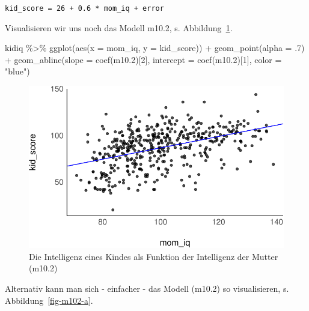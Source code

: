 \documentclass[
  a4paper,
  DIV=11]{scrreprt}
\newenvironment{Shaded}{\begin{snugshade}}{\end{snugshade}}
\newcommand{\AttributeTok}[1]{\textcolor[rgb]{0.40,0.45,0.13}{#1}}
\newcommand{\DecValTok}[1]{\textcolor[rgb]{0.68,0.00,0.00}{#1}}
\newcommand{\FloatTok}[1]{\textcolor[rgb]{0.68,0.00,0.00}{#1}}
\newcommand{\FunctionTok}[1]{\textcolor[rgb]{0.28,0.35,0.67}{#1}}
\newcommand{\NormalTok}[1]{\textcolor[rgb]{0.00,0.23,0.31}{#1}}
\newcommand{\SpecialCharTok}[1]{\textcolor[rgb]{0.37,0.37,0.37}{#1}}
\newcommand{\StringTok}[1]{\textcolor[rgb]{0.13,0.47,0.30}{#1}}
\theoremstyle{definition}
\theoremstyle{remark}
\begin{document}
\texttt{kid\_score\ =\ 26\ +\ 0.6\ *\ mom\_iq\ +\ error}

Visualisieren wir uns noch das Modell m10.2, s.
Abbildung~\ref{fig-kidiqmomiq}.

\begin{Shaded}
\begin{Highlighting}[]
\NormalTok{kidiq }\SpecialCharTok{\%\textgreater{}\%} 
  \FunctionTok{ggplot}\NormalTok{(}\FunctionTok{aes}\NormalTok{(}\AttributeTok{x =}\NormalTok{ mom\_iq, }\AttributeTok{y =}\NormalTok{ kid\_score)) }\SpecialCharTok{+}
  \FunctionTok{geom\_point}\NormalTok{(}\AttributeTok{alpha =}\NormalTok{ .}\DecValTok{7}\NormalTok{) }\SpecialCharTok{+}
  \FunctionTok{geom\_abline}\NormalTok{(}\AttributeTok{slope =} \FunctionTok{coef}\NormalTok{(m10}\FloatTok{.2}\NormalTok{)[}\DecValTok{2}\NormalTok{],}
              \AttributeTok{intercept =} \FunctionTok{coef}\NormalTok{(m10}\FloatTok{.2}\NormalTok{)[}\DecValTok{1}\NormalTok{],}
              \AttributeTok{color =} \StringTok{"blue"}\NormalTok{)}
\end{Highlighting}
\end{Shaded}

\begin{figure}[H]

{\centering \includegraphics{./metrische-AV_files/figure-pdf/fig-kidiqmomiq-1.pdf}

}

\caption{\label{fig-kidiqmomiq}Die Intelligenz eines Kindes als Funktion
der Intelligenz der Mutter (m10.2)}

\end{figure}

Alternativ kann man sich - einfacher - das Modell (m10.2) so
visualisieren, s. Abbildung~\ref{fig-m102-a}.
\end{document}
